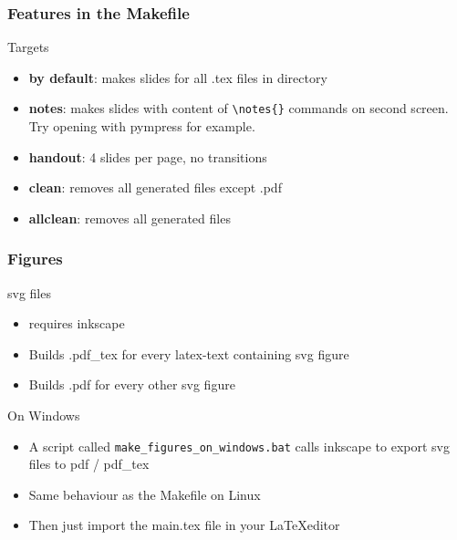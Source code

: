 \documentclass[aspectratio=169,c,12pt]{beamer}
\begin{document}
\begin{frame}[fragile]
	\frametitle[Makefile ft.]{Features in the Makefile}
	\begin{block}{Targets}
		\begin{itemize}
			\item{\textbf{by default}:} makes slides for all .tex files in directory
			\item{\textbf{notes}:} makes slides with content of \verb|\notes{}| commands on second screen.\\ Try opening with pympress for example.
			\item{\textbf{handout}:} 4 slides per page, no transitions
			\item{\textbf{clean}:} removes all generated files except .pdf
			\item{\textbf{allclean}:} removes all generated files
		\end{itemize}
	\end{block}
\end{frame}

\begin{frame}
	\frametitle{Figures}
	\begin{block}{svg files}
		\begin{itemize}
			\item requires inkscape
			\item Builds .pdf\_tex for every latex-text containing svg figure
			\item Builds .pdf for every other svg figure
		\end{itemize}
	\end{block}

	\begin{block}{On Windows}
		\begin{itemize}
			\item A script called \texttt{make\_figures\_on\_windows.bat} calls inkscape to export svg files to pdf / pdf\_tex
			\item Same behaviour as the Makefile on Linux
			\item Then just import the main.tex file in your \LaTeX editor
		\end{itemize}
	\end{block}
\end{frame}
\end{document}
